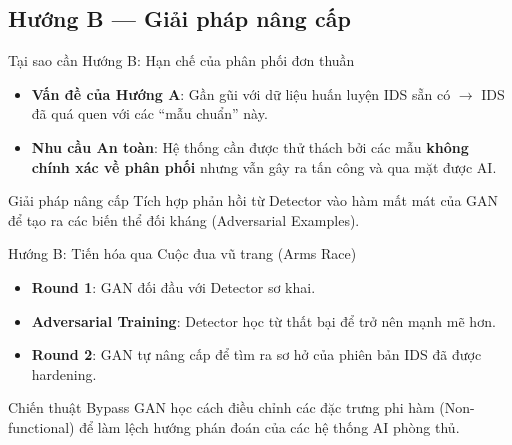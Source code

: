 \documentclass[aspectratio=169,11pt]{beamer}
\begin{document}
\subsection{Hướng B --- Giải pháp nâng cấp}

\begin{frame}{Tại sao cần Hướng B: Hạn chế của phân phối đơn thuần}
  \begin{itemize}
    \item \textbf{Vấn đề của Hướng A}: Gần gũi với dữ liệu huấn luyện IDS
          sẵn có $\to$ IDS đã quá quen với các ``mẫu chuẩn'' này.
    \item \textbf{Nhu cầu An toàn}: Hệ thống cần được thử thách bởi các
          mẫu \textbf{không chính xác về phân phối} nhưng vẫn gây ra tấn
          công và qua mặt được AI.
  \end{itemize}
  \vspace{10pt}
  \begin{alertblock}{Giải pháp nâng cấp}
    Tích hợp phản hồi từ Detector vào hàm mất mát của GAN để tạo ra các
    biến thể đối kháng (Adversarial Examples).
  \end{alertblock}
\end{frame}

\begin{frame}{Hướng B: Tiến hóa qua Cuộc đua vũ trang (Arms Race)}
  \begin{itemize}
    \item \textbf{Round 1}: GAN đối đầu với Detector sơ khai.
    \item \textbf{Adversarial Training}: Detector học từ thất bại để trở
          nên mạnh mẽ hơn.
    \item \textbf{Round 2}: GAN tự nâng cấp để tìm ra sơ hở của phiên bản
          IDS đã được hardening.
  \end{itemize}
  \vspace{10pt}
  \begin{block}{Chiến thuật Bypass}
    GAN học cách điều chỉnh các đặc trưng phi hàm (Non-functional) để làm
    lệch hướng phán đoán của các hệ thống AI phòng thủ.
  \end{block}
\end{frame}
\end{document}
